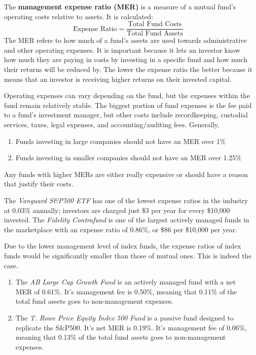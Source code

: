 \documentclass{article}
\begin{document}
      \begin{definition}
        The \textbf{management expense ratio (MER)} is a measure of a mutual fund's operating costs relative to assets. It is calculated: 
        \[\text{Expense Ratio} = \frac{\text{Total Fund Costs}}{\text{Total Fund Assets}}\]
        The MER refers to how much of a fund's assets are used towards administrative and other operating expenses. It is important because it lets an investor know how much they are paying in costs by investing in a specific fund and how much their returns will be reduced by. The lower the expense ratio the better because it means that an investor is receiving higher returns on their invested capital. 


        Operating expenses can vary depending on the fund, but the expenses within the fund remain relatively stable. The biggest portion of fund expenses is the fee paid to a fund's investment manager, but other costs include recordkeeping, custodial services, taxes, legal expenses, and accounting/auditing fees. Generally, 
        \begin{enumerate}
            \item Funds investing in large companies should not have an MER over 1\%
            \item Funds investing in smaller companies should not have an MER over 1.25\%
        \end{enumerate}
        Any funds with higher MERs are either really expensive or should have a reason that justify their costs. 
      \end{definition}

      \begin{example}
        The \textit{Vanguard S\&P500 ETF} has one of the lowest expense ratios in the industry at 0.03\% annually; investors are charged just \$3 per year for every \$10,000 invested. The \textit{Fidelity Contrafund} is one of the largest actively managed funds in the marketplace with an expense ratio of 0.86\%, or \$86 per \$10,000 per year. 
      \end{example}

      \begin{example}
        Due to the lower management level of index funds, the expense ratios of index funds would be significantly smaller than those of mutual ones. This is indeed the case. 
        \begin{enumerate}
          \item The \textit{AB Large Cap Growth Fund} is an actively managed fund with a net MER of 0.61\%. It's management fee is 0.50\%, meaning that 0.11\% of the total fund assets goes to non-management expenses. 
          \item The \textit{T. Rowe Price Equity Index 500 Fund} is a passive fund designed to replicate the S\&P500. It's net MER is 0.19\%. It's management fee of 0.06\%, meaning that 0.13\% of the total fund assets goes to non-management expenses. 
        \end{enumerate}
      \end{example}
\end{document}
